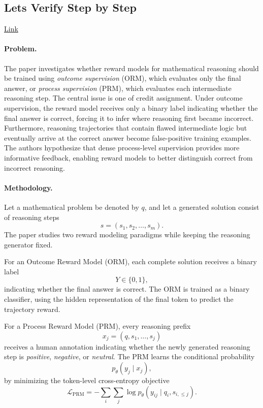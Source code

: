 \documentclass[11pt]{article}
\begin{document}
\subsection{Lets Verify Step by Step}

\href{https://arxiv.org/abs/2305.20050}{Link}

\paragraph{Problem.}
The paper investigates whether reward models for mathematical reasoning should be trained using \emph{outcome supervision} (ORM), which evaluates only the final answer, or \emph{process supervision} (PRM), which evaluates each intermediate reasoning step. The central issue is one of credit assignment. Under outcome supervision, the reward model receives only a binary label indicating whether the final answer is correct, forcing it to infer where reasoning first became incorrect. Furthermore, reasoning trajectories that contain flawed intermediate logic but eventually arrive at the correct answer become false-positive training examples. The authors hypothesize that dense process-level supervision provides more informative feedback, enabling reward models to better distinguish correct from incorrect reasoning.

\paragraph{Methodology.}
Let a mathematical problem be denoted by \(q\), and let a generated solution consist of reasoning steps
\[
s=(s_1,s_2,\ldots,s_m).
\]
The paper studies two reward modeling paradigms while keeping the reasoning generator fixed.

For an Outcome Reward Model (ORM), each complete solution receives a binary label
\[
Y\in\{0,1\},
\]
indicating whether the final answer is correct. The ORM is trained as a binary classifier, using the hidden representation of the final token to predict the trajectory reward.

For a Process Reward Model (PRM), every reasoning prefix
\[
x_j=(q,s_1,\ldots,s_j)
\]
receives a human annotation indicating whether the newly generated reasoning step is \emph{positive}, \emph{negative}, or \emph{neutral}. The PRM learns the conditional probability
\[
p_\theta(y_j\mid x_j),
\]
by minimizing the token-level cross-entropy objective
\[
\mathcal{L}_{\mathrm{PRM}}
=
-\sum_i\sum_j
\log p_\theta(y_{ij}\mid q_i,s_{i,\le j}).
\]
\end{document}
